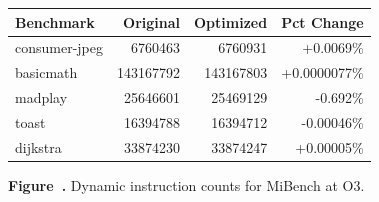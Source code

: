 \par\vspace{1.2em}

\begin{center}
{\normalfont\normalsize
\setlength{\tabcolsep}{5pt}
\renewcommand{\arraystretch}{1.08}
\begin{tabular}{@{}lrrr@{}}
\toprule
Benchmark & Original & Optimized & Pct Change \\
\midrule
consumer-jpeg & 6760463 & 6760931 & +0.0069\% \\
basicmath & 143167792 & 143167803 & +0.0000077\% \\
madplay & 25646601 & 25469129 & -0.692\% \\
toast & 16394788 & 16394712 & -0.00046\% \\
dijkstra & 33874230 & 33874247 & +0.00005\% \\
\bottomrule
\end{tabular}
}
\end{center}

\vspace{0.12em}

\label{fig:figure17}

\begin{center}
\small\textbf{Figure~\thefigure.} Dynamic instruction counts for MiBench at O3.
\end{center}

\par\vspace{1.2em}
